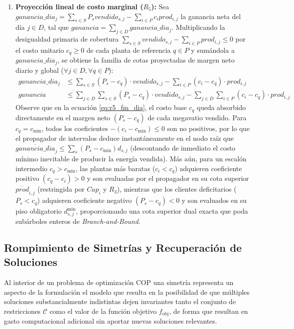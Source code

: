 \begin{enumerate}
    \item \textbf{Proyección lineal de costo marginal ($R_5$):}
    Sea $ganancia\_dia_j = \sum_{s \in S} P_s vendido_{s,j} - \sum_{i \in P} c_i prod_{i,j}$ la ganancia neta del día $j \in D$, tal que $ganancia = \sum_{j \in D} ganancia\_dia_j$. Multiplicando la desigualdad primaria de cobertura $\sum_{s \in S} vendido_{s,j} - \sum_{i \in P} prod_{i,j} \le 0$ por el costo unitario $c_q \ge 0$ de cada planta de referencia $q \in P$ y sumándola a $ganancia\_dia_j$, se obtiene la familia de cotas proyectadas de margen neto diario y global ($\forall j \in D, \forall q \in P$):
    \begin{align}
        ganancia\_dia_j &\le \sum_{s \in S} (P_s - c_q)\cdot vendido_{s,j} - \sum_{i \in P} (c_i - c_q)\cdot prod_{i,j} \label{eq:r5_fm_dia} \\
        ganancia &\le \sum_{j \in D}\sum_{s \in S} (P_s - c_q)\cdot vendido_{s,j} - \sum_{j \in D}\sum_{i \in P} (c_i - c_q)\cdot prod_{i,j} \label{eq:r5_fm_global}
    \end{align}
    Observe que en la ecuación \eqref{eq:r5_fm_dia}, el costo base $c_q$ queda absorbido directamente en el margen neto $(P_s - c_q)$ de cada megavatio vendido. Para $c_q = c_{\min}$, todos los coeficientes $-(c_i - c_{\min}) \le 0$ son no positivos, por lo que el propagador de intervalos deduce instantáneamente en el nodo raíz que $\overline{ganancia\_dia}_j \le \sum_s (P_s - c_{\min}) d_{s,j}$ (descontando de inmediato el costo mínimo inevitable de producir la energía vendida). Más aún, para un escalón intermedio $c_q > c_{\min}$, las plantas más baratas ($c_i < c_q$) adquieren coeficiente positivo $(c_q - c_i) > 0$ y son evaluadas por el propagador en su cota superior $\overline{prod}_{i,j}$ (restringida por $Cap_i$ y $R_3$), mientras que los clientes deficitarios ($P_s < c_q$) adquieren coeficiente negativo $(P_s - c_q) < 0$ y son evaluados en su piso obligatorio $d^{\min}_{s,j}$, proporcionando una cota superior dual exacta que poda subárboles enteros de \emph{Branch-and-Bound}.
\end{enumerate}

\subsection{Rompimiento de Simetrías y Recuperación de Soluciones}
\label{subsec:simetrias}

Al interior de un problema de optimización COP una simetría representa un aspecto de la formulación el modelo que resulta en la posibilidad de que múltiples soluciones substancialmente indistintas dejen invariantes tanto el conjunto de restricciones $\mathcal{C}$ como el valor de la función objetivo $f_{\text{obj}}$, de forma que resultan en gasto computacional adicional sin aportar nuevas soluciones relevantes.\\

